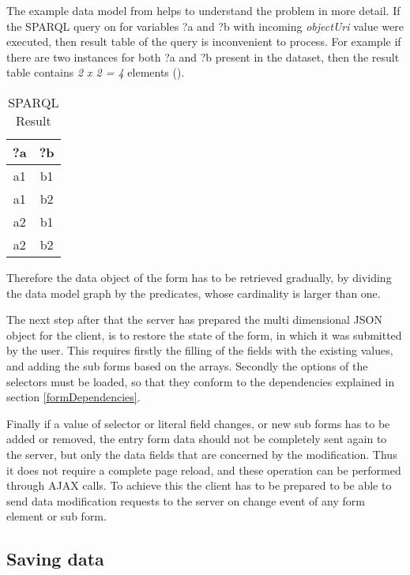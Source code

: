 The example data model from  helps to understand the problem in more detail. If the SPARQL query on  for variables ?a and ?b with incoming \textit{objectUri} value were executed, then result table of the query is inconvenient to process. For example if there are two instances for both ?a and ?b present in the dataset, then the result table contains \textit{2 x 2 = 4} elements ().

\begin{table}

	\begin{center}
		\begin{tabular}{||c | c||} 
			\hline
			?a & ?b  \\ [0.5ex] 
			\hline\hline
			a1 & b1 \\ 
			\hline
			a1 & b2 \\
			\hline
			a2 & b1 \\
			\hline
			a2 & b2 \\ [1ex] 
			\hline 
		\end{tabular}
	\end{center}
	\caption{SPARQL Result}  \label{sparqlResult}
\end{table}


Therefore the data object of the form has to be retrieved gradually, by dividing the data model graph by the predicates, whose cardinality is larger than one.

The next step after that the server has prepared the multi dimensional JSON object for the client, is to restore the state of the form, in which it was submitted by the user. This requires firstly the filling of the fields with the existing values, and adding the sub forms based on the arrays. Secondly the options of the selectors must be loaded, so that they conform to the dependencies explained in section \ref{formDependencies}. 

Finally if a value of selector or literal field changes, or new sub forms has to be added or removed, the entry form data should not be completely sent again to the server, but only the data fields that are concerned by the modification. Thus it does not require a complete page reload, and these operation can be performed through AJAX calls. To achieve this the client has to be prepared to be able to send data modification requests to the server on change event of any form element or sub form.

\subsection{Saving data}













